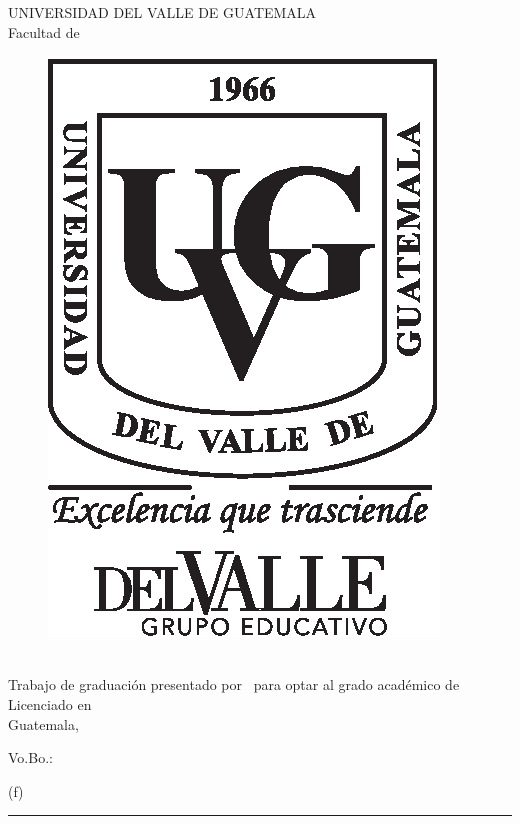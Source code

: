 \documentclass[11pt, letterpaper, twoside, openright]{report}
\begin{document}
		\newpage
		\cleardoublepage{}
		\pagecolor{white}
		\color{black}
		\setcounter{page}{1}
		\thispagestyle{empty}
		\begin{center}
			\LARGE UNIVERSIDAD DEL VALLE DE GUATEMALA\\
			\LARGE Facultad de \uvgfacultad \\[0.75cm]
		\end{center}
		\begin{figure}[h]
			\begin{center}
				\includegraphics[height=5.5 cm]{plantilla/escudoUVGnegro.eps}
				\vspace{0.5in}
			\end{center}
		\end{figure}
		\begin{center}
			\Large \textbf{\nohyphens{\titulotesis}} \\
			\vfill
			\Large \nohyphens{Trabajo de graduación presentado por \nombreestudiante \ para optar al grado académico de Licenciado en \uvgcarrera} \\
			\vfill
			\large Guatemala, \\
			\vspace{1em}
			\anoentrega
		\end{center}
	\fi
\fi

\ifdefined\CAPfirmas
	\newpage
	\cleardoublepage{}
	\thispagestyle{empty}
	\vspace*{0.5in}
	\large Vo.Bo.:\\[1cm]
	\begin{center}
		(f) \rule[1pt]{4 in}{1pt}\\
		\nombreasesor
	\end{center}
	\vspace{1in}
\end{document}
